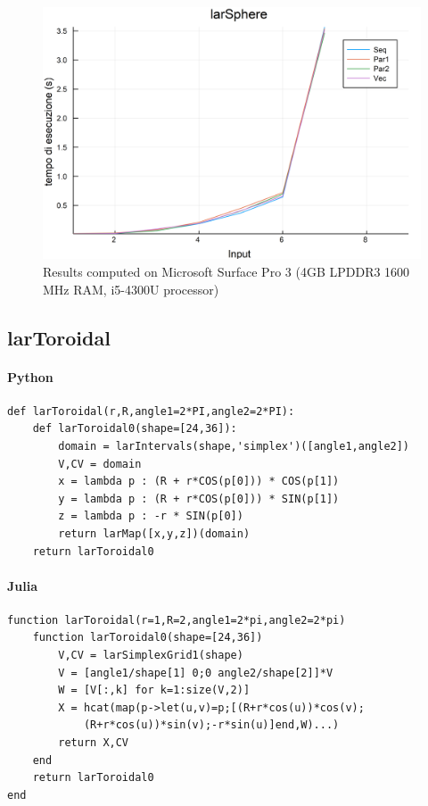 \documentclass{article}
\begin{document}
\begin{figure}[htbp] 
\centering 
\includegraphics[scale=.13]{larSphereTime.png} 
\caption{Results computed on Microsoft Surface Pro  3 (4GB LPDDR3 1600 MHz RAM, i5-4300U processor)} 
\end{figure}

\subsection{larToroidal}

\paragraph{Python}

\begin{verbatim}
def larToroidal(r,R,angle1=2*PI,angle2=2*PI):
    def larToroidal0(shape=[24,36]):
        domain = larIntervals(shape,'simplex')([angle1,angle2])
        V,CV = domain
        x = lambda p : (R + r*COS(p[0])) * COS(p[1])
        y = lambda p : (R + r*COS(p[0])) * SIN(p[1])
        z = lambda p : -r * SIN(p[0])
        return larMap([x,y,z])(domain)
    return larToroidal0
\end{verbatim}

\paragraph{Julia}

\begin{verbatim}
function larToroidal(r=1,R=2,angle1=2*pi,angle2=2*pi)
    function larToroidal0(shape=[24,36])
        V,CV = larSimplexGrid1(shape)
        V = [angle1/shape[1] 0;0 angle2/shape[2]]*V
        W = [V[:,k] for k=1:size(V,2)]
        X = hcat(map(p->let(u,v)=p;[(R+r*cos(u))*cos(v);
        	(R+r*cos(u))*sin(v);-r*sin(u)]end,W)...) 
        return X,CV
    end
    return larToroidal0    
end
\end{verbatim}
\end{document}
